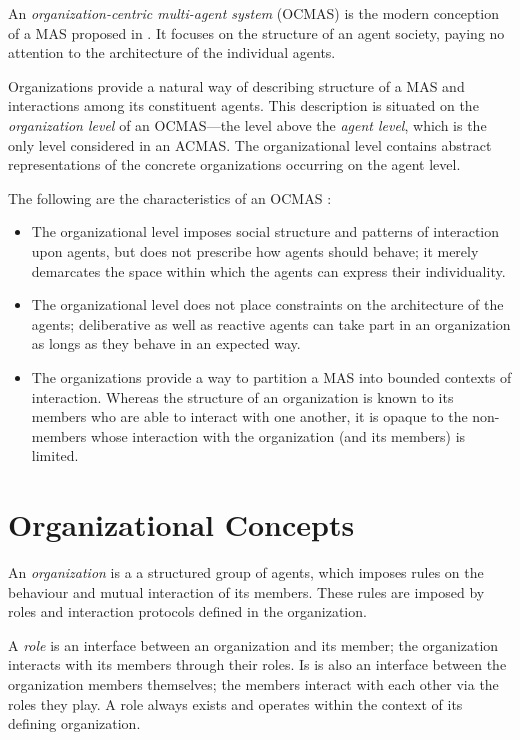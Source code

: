 An \textit{organization-centric multi-agent system} (OCMAS) is the modern conception of a MAS proposed in \cite{Ferber03}.
It focuses on the structure of an agent society, paying no attention to the architecture of the individual agents.

Organizations provide a natural way of describing structure of a MAS and interactions among its constituent agents.
This description is situated on the \textit{organization level} of an OCMAS---the level above the \textit{agent level}, which is the only level considered in an ACMAS.
The organizational level contains abstract representations of the concrete organizations occurring on the agent level.

The following are the characteristics of an OCMAS \cite{Ferber03}:
\begin{itemize}
	\item The organizational level imposes social structure and patterns of interaction upon agents, but does not prescribe how agents should behave; it merely demarcates the space within which the agents can express their individuality.
	\item The organizational level does not place constraints on the architecture of the agents; deliberative as well as reactive agents can take part in an organization as longs as they behave in an expected way.
	\item The organizations provide a way to partition a MAS into bounded contexts of interaction.
	Whereas the structure of an organization is known to its members who are able to interact with one another, it is opaque to the non-members whose interaction with the organization (and its members) is limited.
\end{itemize}

\section{Organizational Concepts}

An \textit{organization} is a a structured group of agents, which imposes rules on the behaviour and mutual interaction of its members. 
These rules are imposed by roles and interaction protocols defined in the organization.

A \textit{role} is an interface between an organization and its member; the organization interacts with its members through their roles.
Is is also an interface between the organization members themselves; the members interact with each other via the roles they play.
A role always exists and operates within the context of its defining organization.

